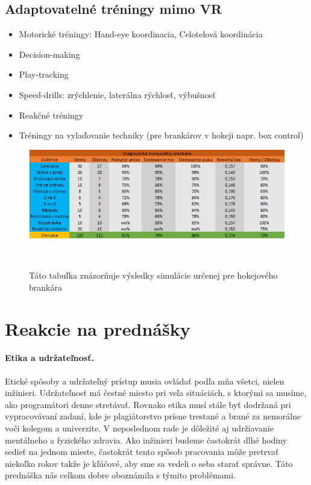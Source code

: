 \documentclass[10pt,twoside,slovak,a4paper]{article}										%
\begin{document}
\subsection{Adaptovatelné tréningy mimo VR} 
\begin{itemize}
\item Motorické tréningy: Hand-eye koordinacia, Celotelová koordinácia	
\item Decision-making
\item Play-tracking
\item Speed-drills: zrýchlenie, laterálna rýchlosť, výbušnosť
\item Reakčné tréningy
\item Tréningy na vylaďovanie techniky (pre brankárov v hokeji napr. box control)
\end{itemize}

\clearpage
\begin{figure}[h]
\centering
\includegraphics[scale=0.59]{tabulka.png}
\caption{Táto tabuľka znázorňuje výsledky simulácie určenej pre hokejového brankára}  ~\cite{Hlavny:zdroj}
\label{fig}
\end{figure}

\section{Reakcie na prednášky}

\paragraph{Etika a udržateľnosť. } 
Etické spôsoby a udržateľný prístup musia ovládať podľa mňa všetci, nielen inžinieri. Udržateľnosť má čestné miesto pri veľa situáciách, s ktorými sa musíme, ako programátori denne stretávať. Rovnako etika musí stále byť dodržaná pri vypracovávaní zadaní, kde je plagiátorstvo prísne trestané a brané za nemorálne voči kolegom a univerzite. V neposlednom rade je dôležité aj udržiavanie mentálneho a fyzického zdravia. Ako inžinieri budeme častokrát dlhé hodiny sedieť na jednom mieste, častokrát tento spôsob pracovania môže pretrvať niekoľko rokov takže je kľúčové, aby sme sa vedeli o seba starať správne. Táto prednáška nás celkom dobre oboznámila s týmito problémami.~\cite{etics:zdroj}
\end{document}
